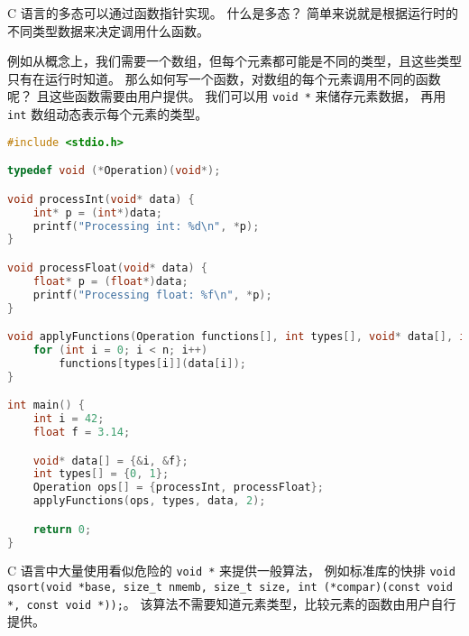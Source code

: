 

C 语言的多态可以通过函数指针实现。 什么是多态？ 简单来说就是根据运行时的不同类型数据来决定调用什么函数。

例如从概念上，我们需要一个数组，但每个元素都可能是不同的类型，且这些类型只有在运行时知道。 那么如何写一个函数，对数组的每个元素调用不同的函数呢？ 且这些函数需要由用户提供。 我们可以用 \verb`void *` 来储存元素数据， 再用 \verb`int` 数组动态表示每个元素的类型。

\begin{lstlisting}[language=cpp]
#include <stdio.h>

typedef void (*Operation)(void*);

void processInt(void* data) {
    int* p = (int*)data;
    printf("Processing int: %d\n", *p);
}

void processFloat(void* data) {
    float* p = (float*)data;
    printf("Processing float: %f\n", *p);
}

void applyFunctions(Operation functions[], int types[], void* data[], int n) {
    for (int i = 0; i < n; i++)
        functions[types[i]](data[i]);
}

int main() {
    int i = 42;
    float f = 3.14;

    void* data[] = {&i, &f};
    int types[] = {0, 1};
    Operation ops[] = {processInt, processFloat};
    applyFunctions(ops, types, data, 2);

    return 0;
}
\end{lstlisting}

C 语言中大量使用看似危险的 \verb`void *` 来提供一般算法， 例如标准库的快排 \verb`void qsort(void *base, size_t nmemb, size_t size, int (*compar)(const void *, const void *));`。 该算法不需要知道元素类型，比较元素的函数由用户自行提供。
